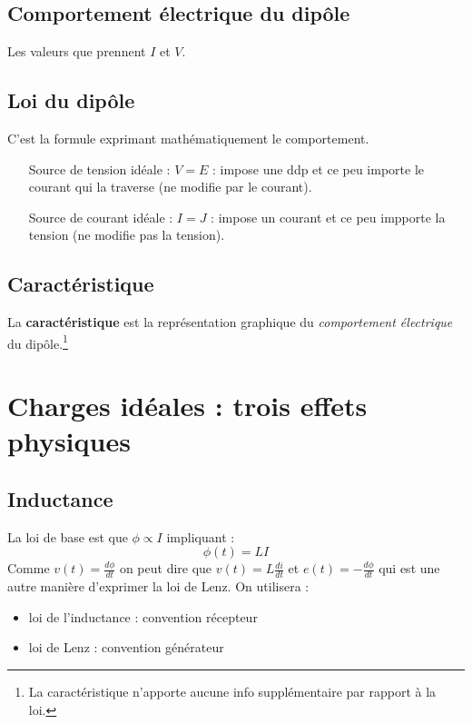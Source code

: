 \documentclass[11pt, a4paper, openany]{book}
\begin{document}
		\subsection{Comportement électrique du dipôle}
		Les valeurs que prennent $I$ et $V$.
		
		\subsection{Loi du dipôle}
		C'est la formule exprimant mathématiquement le comportement.
		\begin{itemize}
			\item[Source de tension idéale] : $V = E$ : impose une ddp et ce peu importe le courant qui la traverse (ne modifie par le courant).
			\item[Source de courant idéale] : $I = J$ : impose un courant et ce peu impporte la tension (ne modifie pas la tension).
		\end{itemize}
		
		\subsection{Caractéristique}
		La \textbf{caractéristique} est la représentation graphique du \textit{comportement électrique} du dipôle.\footnote{La caractéristique n'apporte aucune info supplémentaire par rapport à la loi.}
		
		\setcounter{section}{2}
		\section{Charges idéales : trois effets physiques}
		\setcounter{subsection}{1}
		\subsection{Inductance}
		La loi de base est que $\phi \propto I$ impliquant :
		\begin{equation}
		\phi (t) = LI
		\end{equation}
		Comme $v(t) = \frac{d\phi}{dt}$ on peut dire que $v(t) = L\frac{di}{dt}$ et $e(t) = -\frac{d\phi}{dt}$ qui est une autre manière d'exprimer la loi de Lenz. On utilisera :
		\begin{itemize}
			\item loi de l'inductance : convention récepteur
			\item loi de Lenz : convention générateur
		\end{itemize}
		
\end{document}
